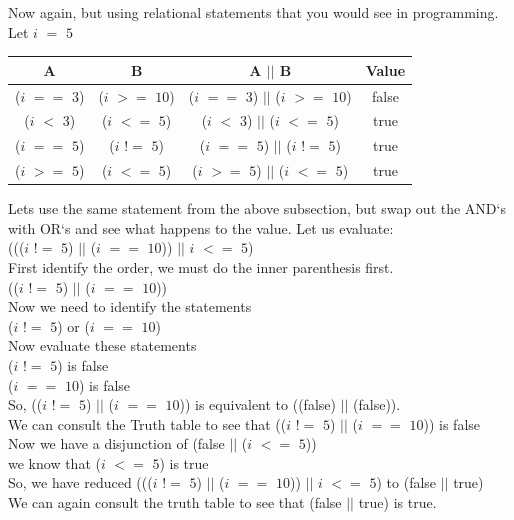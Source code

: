 \documentclass[11]{article}
\begin{document}
Now again, but using relational statements that you would see in programming. Let $i$ $=$ $5$
\begin{center}
  \begin{tabular}{ | c | c | c | c |}
    \hline
    A & B & A $||$ B & Value\\ \hline
    ($i$ $==$ $3$) & ($i$ $>=$ $10$) & ($i$ $==$ $3$) $||$ ($i$ $>=$ $10$) & false \\ \hline
    ($i$ $<$ $3$) & ($i$ $<=$ $5$) & ($i$ $<$ $3$) $||$ ($i$ $<=$ $5$) & true \\ \hline
    ($i$ $==$ $5$) & ($i$ $!=$ $5$) &  ($i$ $==$ $5$) $||$ ($i$ $!=$ $5$)& true \\ \hline
    ($i$ $>=$ $5$) & ($i$ $<=$ $5$) & ($i$ $>=$ $5$) $||$ ($i$ $<=$ $5$) & true \\
    \hline
  \end{tabular}
\end{center}

Lets use the same statement from the above subsection, but swap out the AND`s with OR`s and see what happens to the value. Let us evaluate: \\
((($i$ $!=$ $5$) $||$ ($i$ $==$ $10$)) $||$ $i$ $<=$ $5$)\\

First identify the order, we must do the inner parenthesis first.\\
(($i$ $!=$ $5$) $||$ ($i$ $==$ $10$))\\
Now we need to identify the statements\\
($i$ $!=$ $5$) or ($i$ $==$ $10$) \\
Now evaluate these statements \\
($i$ $!=$ $5$) is false\\
 ($i$ $==$ $10$) is false \\
 So, (($i$ $!=$ $5$) $||$ ($i$ $==$ $10$)) is equivalent to ((false) $||$ (false)).\\
 We can consult the Truth table to see that (($i$ $!=$ $5$) $||$ ($i$ $==$ $10$)) is false\\
 
 Now we have a disjunction of (false $||$ ($i$ $<=$ $5$))\\
 we know that ($i$ $<=$ $5$) is true \\
 So, we have reduced ((($i$ $!=$ $5$) $||$ ($i$ $==$ $10$)) $||$ $i$ $<=$ $5$) to (false $||$ true)\\
 We can again consult the truth table to see that (false $||$ true) is true.\\
 
\end{document}
